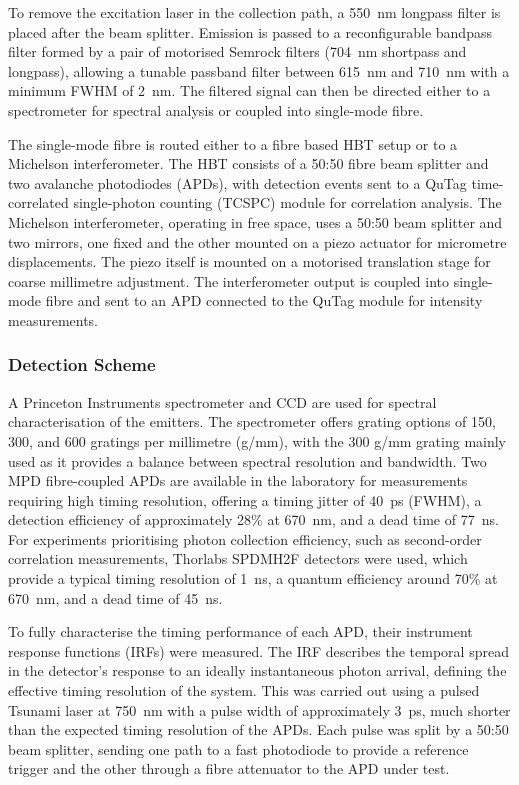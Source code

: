 To remove the excitation laser in the collection path, a 550~nm longpass filter is placed after the beam splitter. Emission is passed to a reconfigurable bandpass filter formed by a pair of motorised Semrock filters (704~nm shortpass and longpass), allowing a tunable passband filter between 615~nm and 710~nm with a minimum FWHM of 2~nm. The filtered signal can then be directed either to a spectrometer for spectral analysis or coupled into single-mode fibre.

The single-mode fibre is routed either to a fibre based HBT setup or to a Michelson interferometer. The HBT consists of a 50:50 fibre beam splitter and two avalanche photodiodes (APDs), with detection events sent to a QuTag time-correlated single-photon counting (TCSPC) module for correlation analysis. The Michelson interferometer, operating in free space, uses a 50:50 beam splitter and two mirrors, one fixed and the other mounted on a piezo actuator for micrometre displacements. The piezo itself is mounted on a motorised translation stage for coarse millimetre adjustment. The interferometer output is coupled into single-mode fibre and sent to an APD connected to the QuTag module for intensity measurements.



\subsubsection{Detection Scheme}

A Princeton Instruments spectrometer and CCD are used for spectral characterisation of the emitters. The spectrometer offers grating options of 150, 300, and 600 gratings per millimetre (g/mm), with the 300 g/mm grating mainly used as it provides a balance between spectral resolution and bandwidth. Two MPD fibre-coupled APDs are available in the laboratory for measurements requiring high timing resolution, offering a timing jitter of 40~ps (FWHM), a detection efficiency of approximately 28\% at 670~nm, and a dead time of 77~ns. For experiments prioritising photon collection efficiency, such as second-order correlation measurements, Thorlabs SPDMH2F detectors were used, which provide a typical timing resolution of 1~ns, a quantum efficiency around 70\% at 670~nm, and a dead time of 45~ns.

To fully characterise the timing performance of each APD, their instrument response functions (IRFs) were measured. The IRF describes the temporal spread in the detector’s response to an ideally instantaneous photon arrival, defining the effective timing resolution of the system. This was carried out using a pulsed Tsunami laser at 750~nm with a pulse width of approximately 3~ps, much shorter than the expected timing resolution of the APDs. Each pulse was split by a 50:50 beam splitter, sending one path to a fast photodiode to provide a reference trigger and the other through a fibre attenuator to the APD under test.

